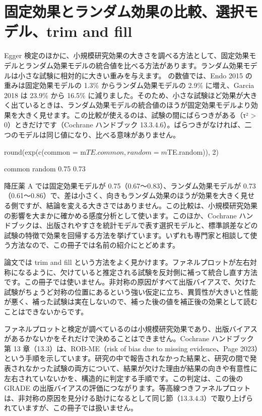 \section{\hatten 固定効果とランダム効果の比較、選択モデル、trim and fill}
\label{sec:07-4}

Egger 検定のほかに、小規模研究効果の大きさを調べる方法として、固定効果モデルとランダム効果モデルの統合値を比べる方法があります。ランダム効果モデルは小さな試験に相対的に大きい重みを与えます。 の数値では、Endo 2015 の重みは固定効果モデルの 1.3\% からランダム効果モデルの 2.9\% に増え、Garcia 2018 は 23.9\% から 16.5\% に減りました。そのため、小さな試験ほど効果が大きく出ているときは、ランダム効果モデルの統合値のほうが固定効果モデルより効果を大きく見せます。この比較が使えるのは、試験の間にばらつきがある（τ² > 0）ときだけです（Cochrane ハンドブック 13.3.4.6）。ばらつきがなければ、二つのモデルは同じ値になり、比べる意味がありません。

\begin{rcode}
round(exp(c(common = m$TE.common,
            random = m$TE.random)), 2)
\end{rcode}

\begin{rout}
common random
  0.75   0.73
\end{rout}

降圧薬 A では固定効果モデルが 0.75（0.67〜0.83）、ランダム効果モデルが 0.73（0.61〜0.86）で、差は小さく、向きもランダム効果のほうが効果を大きく見せる側ですが、結論を変える大きさではありません。この比較は、小規模研究効果の影響を大まかに確かめる感度分析として使います。このほか、Cochrane ハンドブックは、出版されやすさを統計モデルで表す選択モデルと、標準誤差などの試験の特徴で効果を回帰する方法を挙げています。いずれも専門家と相談して使う方法なので、この冊子では名前の紹介にとどめます。

論文では trim and fill という方法をよく見かけます。ファネルプロットが左右対称になるように、欠けていると推定される試験を反対側に補って統合し直す方法です。この冊子では使いません。非対称の原因がすべて出版バイアスで、欠けた試験がちょうど対称の位置にあるという強い仮定に立ち、異質性が大きいと性能が悪く、補った試験は実在しないので、補った後の値を補正後の効果として読むことはできないからです。

ファネルプロットと検定が調べているのは小規模研究効果であり、出版バイアスがあるかないかをそれだけで決めることはできません。Cochrane ハンドブック第 13 章（13.3）は、ROB-ME（risk of bias due to missing evidence、Page 2023）という手順を示しています。研究の中で報告されなかった結果と、研究の間で発表されなかった試験の両方について、結果が欠けた理由が結果の向きや有意性に左右されていないかを、構造的に判定する手順です。この判定は、この後の GRADE の出版バイアスの評価につながります。等高線つきファネルプロットは、非対称の原因を見分ける助けになるとして同じ節（13.3.4.3）で取り上げられていますが、この冊子では扱いません。

